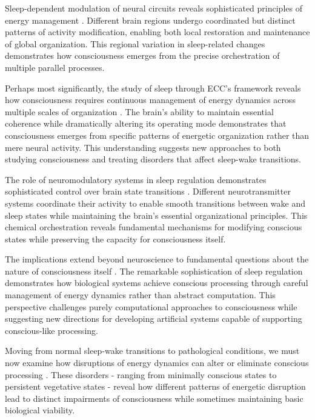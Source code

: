 \begin{refsection}
Sleep-dependent modulation of neural circuits reveals sophisticated principles of energy management \cite{Vyazovskiy2013}. Different brain regions undergo coordinated but distinct patterns of activity modification, enabling both local restoration and maintenance of global organization. This regional variation in sleep-related changes demonstrates how consciousness emerges from the precise orchestration of multiple parallel processes.

Perhaps most significantly, the study of sleep through ECC's framework reveals how consciousness requires continuous management of energy dynamics across multiple scales of organization \cite{Scammell2017}. The brain's ability to maintain essential coherence while dramatically altering its operating mode demonstrates that consciousness emerges from specific patterns of energetic organization rather than mere neural activity. This understanding suggests new approaches to both studying consciousness and treating disorders that affect sleep-wake transitions.

The role of neuromodulatory systems in sleep regulation demonstrates sophisticated control over brain state transitions \cite{Zhang2018}. Different neurotransmitter systems coordinate their activity to enable smooth transitions between wake and sleep states while maintaining the brain's essential organizational principles. This chemical orchestration reveals fundamental mechanisms for modifying conscious states while preserving the capacity for consciousness itself.

The implications extend beyond neuroscience to fundamental questions about the nature of consciousness itself \cite{Krueger2016}. The remarkable sophistication of sleep regulation demonstrates how biological systems achieve conscious processing through careful management of energy dynamics rather than abstract computation. This perspective challenges purely computational approaches to consciousness while suggesting new directions for developing artificial systems capable of supporting conscious-like processing.

Moving from normal sleep-wake transitions to pathological conditions, we must now examine how disruptions of energy dynamics can alter or eliminate conscious processing \cite{Mander2017}. These disorders - ranging from minimally conscious states to persistent vegetative states - reveal how different patterns of energetic disruption lead to distinct impairments of consciousness while sometimes maintaining basic biological viability.


\end{refsection}
